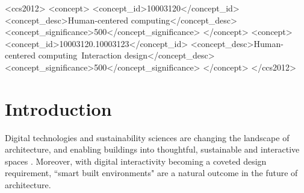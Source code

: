 \documentclass[manuscript, anonymous, review]{acmart}
\begin{document}

\begin{CCSXML}
<ccs2012>
   <concept>
       <concept_id>10003120</concept_id>
       <concept_desc>Human-centered computing</concept_desc>
       <concept_significance>500</concept_significance>
       </concept>
   <concept>
       <concept_id>10003120.10003123</concept_id>
       <concept_desc>Human-centered computing~Interaction design</concept_desc>
       <concept_significance>500</concept_significance>
       </concept>
 </ccs2012>
\end{CCSXML}




 
\maketitle

\section{Introduction}
Digital technologies and sustainability sciences are changing the landscape of architecture, and enabling buildings into thoughtful, sustainable and interactive spaces  \cite{kolarevic2004architecture}. Moreover, with digital interactivity becoming a coveted design requirement, ``smart built environments" are a natural outcome in the future of architecture. 
\end{document}
